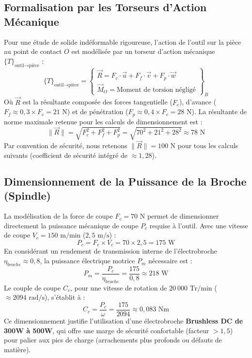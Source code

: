 \subsection{Formalisation par les Torseurs d'Action Mécanique}
Pour une étude de solide indéformable rigoureuse, l'action de l'outil sur la pièce au point de contact $O$ est modélisée par un torseur d'action mécanique $\{T\}_{\text{outil} \to \text{pièce}}$ :
\begin{equation}
    \{T\}_{\text{outil} \to \text{pièce}} = 
    \begin{Bmatrix}
        \vec{R} = F_c \cdot \vec{u} + F_f \cdot \vec{v} + F_p \cdot \vec{w} \\
        \vec{M}_O = \text{Moment de torsion négligé}
    \end{Bmatrix}_B
\end{equation}
Où $\vec{R}$ est la résultante composée des forces tangentielle ($F_c$), d'avance ($F_f \approx 0{,}3 \times F_c = 21\text{ N}$) et de pénétration ($F_p \approx 0{,}4 \times F_c = 28\text{ N}$). La résultante de norme maximale retenue pour les calculs de dimensionnement est :
\begin{equation}
    \| \vec{R} \| = \sqrt{F_c^2 + F_f^2 + F_p^2} = \sqrt{70^2 + 21^2 + 28^2} \approx \boxed{78 \text{ N}}
\end{equation}
Par convention de sécurité, nous retenons $\|\vec{R}\| = 100\text{ N}$ pour tous les calculs suivants (coefficient de sécurité intégré de $\approx 1{,}28$).

\subsection{Dimensionnement de la Puissance de la Broche (Spindle)}
La modélisation de la force de coupe $F_c = 70\text{ N}$ permet de dimensionner directement la puissance mécanique de coupe $P_c$ requise à l'outil. Avec une vitesse de coupe $V_c = 150 \text{ m/min}$ ($2{,}5 \text{ m/s}$) :
\begin{equation}
    P_c = F_c \times V_c = 70 \times 2{,}5 = \boxed{175 \text{ W}}
\end{equation}
En considérant un rendement de transmission interne de l'électrobroche $\eta_{broche} \approx 0{,}8$, la puissance électrique motrice $P_m$ nécessaire est :
\begin{equation}
    P_m = \frac{P_c}{\eta_{broche}} = \frac{175}{0{,}8} \approx \boxed{218 \text{ W}}
\end{equation}
Le couple de coupe $C_c$, pour une vitesse de rotation de $20~000\text{ Tr/min}$ ($\approx 2094\text{ rad/s}$), s'établit à :
\begin{equation}
    C_c = \frac{P_c}{\omega} = \frac{175}{2094} \approx \boxed{0{,}083 \text{ Nm}}
\end{equation}
Ce dimensionnement justifie l'utilisation d'une électrobroche \textbf{Brushless DC de 300W à 500W}, qui offre une marge de sécurité confortable (facteur $>1{,}5$) pour palier aux pics de charge (arrachements plus profonds ou défauts de matière).

